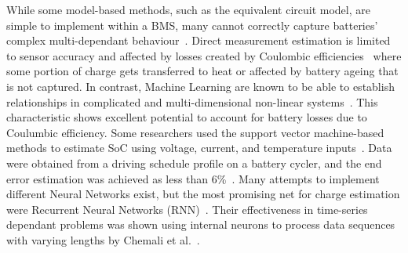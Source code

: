 %
%
While some model-based methods, such as the equivalent circuit model, are simple to implement within a BMS, many cannot correctly capture batteries' complex multi-dependant behaviour~\cite{6953745}.
Direct measurement estimation is limited to sensor accuracy and affected by losses created by Coulombic efficiencies~\cite{Smith_2010} where some portion of charge gets transferred to heat or affected by battery ageing that is not captured.
%
In contrast, Machine Learning are known to be able to establish relationships in complicated and multi-dimensional non-linear systems~\cite{hansen_support_2005,anton_battery_2013,he_state_2014}.
This characteristic shows excellent potential to account for battery losses due to Coulumbic efficiency.
Some researchers used the support vector machine-based methods to estimate SoC using voltage, current, and temperature inputs~\cite{hansen_support_2005,anton_battery_2013}.
Data were obtained from a driving schedule profile on a battery cycler, and the end error estimation was achieved as less than 6\%~\cite{he_state_2014}.
Many attempts to implement different Neural Networks exist, but the most promising net for charge estimation were Recurrent Neural Networks (RNN)~\cite{song_lithium-ion_2018,Chemali2017,mamo_long_2020,jiao_gru-rnn_2020,xiao_accurate_2019,javid_adaptive_2020,zhang_deep_2020}.
Their effectiveness in time-series dependant problems was shown using internal neurons to process data sequences with varying lengths by Chemali et al.~\cite{Chemali2017}.

